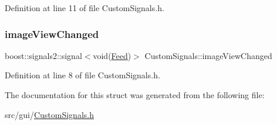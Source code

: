 Definition at line 11 of file Custom\+Signals.\+h.

\mbox{\label{struct_custom_signals_ac453891590a3536656f21a5ef55efcbe}} 
\subsubsection{\texorpdfstring{image\+View\+Changed}{imageViewChanged}}
{\footnotesize\ttfamily boost\+::signals2\+::signal$<$void(\hyperlink{_capture_and_detect_8h_a425a93be55e757f5e351ec9d6770c50e}{Feed})$>$ Custom\+Signals\+::image\+View\+Changed}



Definition at line 8 of file Custom\+Signals.\+h.



The documentation for this struct was generated from the following file\+:\begin{DoxyCompactItemize}
\item 
src/gui/\hyperlink{_custom_signals_8h}{Custom\+Signals.\+h}\end{DoxyCompactItemize}
